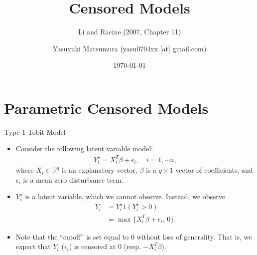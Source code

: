 \documentclass[xcolor=svgnames,dvipdfmx,cjk]{beamer}
\theoremstyle{example}
\def\R{\mathbb{R}}
\begin{document}
 

\title{Censored Models} 
\subtitle{Li and Racine (2007, Chapter 11)}
\author{Yasuyuki Matsumura (yasu0704xx [at] gmail.com)}
\date{\today} %

\begin{frame}                  
\titlepage            
\end{frame}



\section{Parametric Censored Models}

\begin{frame}{Type-1 Tobit Model}
      \begin{itemize}
            \item Consider the following latent variable model:
                  \begin{align*}
                        Y_i^{\star} = X_i^T \beta + \epsilon_i, \quad i=1, \cdots n,
                  \end{align*}
                  where $X_i \in \R^q$ is an explanatory vector, 
                  $\beta$ is a $q \times 1$ vector of coefficients, and
                  $\epsilon_i$ is a mean zero disturbance term.
            \item $Y_i^{\star}$ is a latent variable, which we cannot observe.
                  Instead, we observe 
                  \begin{align*}
                        Y_i   &= Y_i^{\star} 1(Y_i^{\star} > 0) \\
                              &= \max\{ X_i^T \beta + \epsilon_i, \, 0 \}.
                  \end{align*}
            \item Note that the ``cutoff'' is set equal to $0$ without loss of generality.
                  That is, we expect that $Y_i$ ($\epsilon_i$) is censored at $0$ (resp. $-X_i^T\beta$). 
      \end{itemize}
\end{frame}
\end{document}
